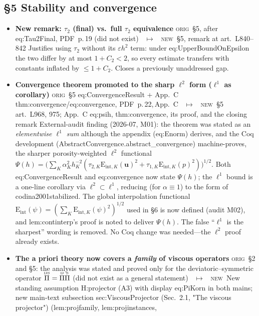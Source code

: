 \documentclass[11pt]{article}
\newcommand{\Orig}{\textcolor{origc}{\footnotesize\textsc{orig}}}
\newcommand{\New}{\textcolor{newc}{\footnotesize\textsc{new}}}
\newcommand{\code}[1]{\textcolor{newc}{\ttfamily\small #1}}
\newcommand{\pdfp}[1]{PDF~p.\,#1}
\newcommand{\artl}[1]{art.\ L#1}       %
\newcommand{\ch}[4]{%
  \item \textbf{#1}\newline
    {\footnotesize\Orig\ #2 \ \textcolor{locc}{$\longmapsto$} \ \New\ #3}\newline
    #4}
\begin{document}
\subsection{\S5 Stability and convergence}
\begin{itemize}
\ch{New remark: $\tau_2$ (final) vs.\ full $\tau_2$ equivalence}
   {\S5, after \code{eq:Tau2Final}, \pdfp{19} (did not exist)}
   {\S5, remark at \artl{840}--842}
   {Justifies using $\tau_2$ without its $\varepsilon h^2$ term: under \code{eq:UpperBoundOnEpsilon}
    the two differ by at most $1+C_2<2$, so every estimate transfers with constants inflated by
    $\le 1+C_2$. Closes a previously unaddressed gap.}
\ch{Convergence theorem promoted to the sharp $\ell^2$ form ($\ell^1$ as corollary)}
   {\S5 \code{eq:ConvergenceResult} + App.\ C \code{thm:convergence}/\code{eq:convergence}, \pdfp{22},\,App.\ C}
   {\S5 \artl{968}, 975; App.\ C \code{eq:psih}, \code{thm:convergence}, its proof, and the closing remark}
   {External-audit finding (2026-07, M01): the theorem was stated as an \emph{elementwise $\ell^1$ sum}
    although the appendix (\code{eq:Enorm}) derives, and the Coq development (\code{AbstractConvergence.abstract\_convergence})
    machine-proves, the sharper porosity-weighted \emph{$\ell^2$} functional
    $\Psi(h)=\big(\sum_K\alpha_K^2 h_K^{-2}(\tau_{2,K}\mathrm E_{\mathrm{int},K}(\boldsymbol u)^2+\tau_{1,K}\mathrm E_{\mathrm{int},K}(p)^2)\big)^{1/2}$.
    Both \code{eq:ConvergenceResult} and \code{eq:convergence} now state $\Psi(h)$; the $\ell^1$ bound is
    a one-line corollary via $\ell^2\!\subset\!\ell^1$, reducing (for $\alpha\equiv1$) to the form of
    \code{codina2001stabilized}. The global interpolation functional
    $\mathrm E_{\mathrm{int}}(\psi)=(\sum_K\mathrm E_{\mathrm{int},K}(\psi)^2)^{1/2}$ used in \S6 is now
    defined (audit M02), and \code{lem:continterp}'s proof is noted to deliver $\Psi(h)$. The false
    ``$\ell^1$ is the sharpest'' wording is removed. No Coq change was needed---the $\ell^2$ proof already exists.}
\ch{The a priori theory now covers a \emph{family} of viscous operators}
   {\S2 and \S5: the analysis was stated and proved only for the deviatoric--symmetric
    operator $\smash{\overset{\scriptscriptstyle\mathrm{DS}}{\Pi}}=\smash{\overset{\scriptscriptstyle\mathrm{D}}{\Pi}}\smash{\overset{\scriptscriptstyle\mathrm{S}}{\Pi}}$ (did not exist as a general statement)}
   {New standing assumption \code{H:projector} (A3) with display \code{eq:PiKorn} in both mains;
    new main-text subsection \code{sec:ViscousProjector} (Sec.~2.1, "The viscous projector") (\code{lem:projfamily}, \code{lem:projinstances},
}
\end{itemize}
\end{document}
